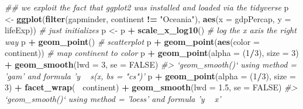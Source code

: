 \documentclass[
]{book}
\newenvironment{Shaded}{\begin{snugshade}}{\end{snugshade}}
\newcommand{\CommentTok}[1]{\textcolor[rgb]{0.56,0.35,0.01}{\textit{#1}}}
\newcommand{\DataTypeTok}[1]{\textcolor[rgb]{0.13,0.29,0.53}{#1}}
\newcommand{\DecValTok}[1]{\textcolor[rgb]{0.00,0.00,0.81}{#1}}
\newcommand{\FloatTok}[1]{\textcolor[rgb]{0.00,0.00,0.81}{#1}}
\newcommand{\KeywordTok}[1]{\textcolor[rgb]{0.13,0.29,0.53}{\textbf{#1}}}
\newcommand{\NormalTok}[1]{#1}
\newcommand{\OperatorTok}[1]{\textcolor[rgb]{0.81,0.36,0.00}{\textbf{#1}}}
\newcommand{\OtherTok}[1]{\textcolor[rgb]{0.56,0.35,0.01}{#1}}
\newcommand{\StringTok}[1]{\textcolor[rgb]{0.31,0.60,0.02}{#1}}
\begin{document}
\begin{Shaded}
\begin{Highlighting}[]
\CommentTok{## we exploit the fact that ggplot2 was installed and loaded via the tidyverse}
\NormalTok{p <-}\StringTok{ }\KeywordTok{ggplot}\NormalTok{(}\KeywordTok{filter}\NormalTok{(gapminder, continent }\OperatorTok{!=}\StringTok{ "Oceania"}\NormalTok{),}
            \KeywordTok{aes}\NormalTok{(}\DataTypeTok{x =}\NormalTok{ gdpPercap, }\DataTypeTok{y =}\NormalTok{ lifeExp)) }\CommentTok{# just initializes}
\NormalTok{p <-}\StringTok{ }\NormalTok{p }\OperatorTok{+}\StringTok{ }\KeywordTok{scale_x_log10}\NormalTok{() }\CommentTok{# log the x axis the right way}
\NormalTok{p }\OperatorTok{+}\StringTok{ }\KeywordTok{geom_point}\NormalTok{() }\CommentTok{# scatterplot}
\NormalTok{p }\OperatorTok{+}\StringTok{ }\KeywordTok{geom_point}\NormalTok{(}\KeywordTok{aes}\NormalTok{(}\DataTypeTok{color =}\NormalTok{ continent)) }\CommentTok{# map continent to color}
\NormalTok{p }\OperatorTok{+}\StringTok{ }\KeywordTok{geom_point}\NormalTok{(}\DataTypeTok{alpha =}\NormalTok{ (}\DecValTok{1}\OperatorTok{/}\DecValTok{3}\NormalTok{), }\DataTypeTok{size =} \DecValTok{3}\NormalTok{) }\OperatorTok{+}\StringTok{ }\KeywordTok{geom_smooth}\NormalTok{(}\DataTypeTok{lwd =} \DecValTok{3}\NormalTok{, }\DataTypeTok{se =} \OtherTok{FALSE}\NormalTok{)}
\CommentTok{#> `geom_smooth()` using method = 'gam' and formula 'y ~ s(x, bs = "cs")'}
\NormalTok{p }\OperatorTok{+}\StringTok{ }\KeywordTok{geom_point}\NormalTok{(}\DataTypeTok{alpha =}\NormalTok{ (}\DecValTok{1}\OperatorTok{/}\DecValTok{3}\NormalTok{), }\DataTypeTok{size =} \DecValTok{3}\NormalTok{) }\OperatorTok{+}\StringTok{ }\KeywordTok{facet_wrap}\NormalTok{(}\OperatorTok{~}\StringTok{ }\NormalTok{continent) }\OperatorTok{+}
\StringTok{  }\KeywordTok{geom_smooth}\NormalTok{(}\DataTypeTok{lwd =} \FloatTok{1.5}\NormalTok{, }\DataTypeTok{se =} \OtherTok{FALSE}\NormalTok{)}
\CommentTok{#> `geom_smooth()` using method = 'loess' and formula 'y ~ x'}
\end{Highlighting}
\end{Shaded}
\end{document}
